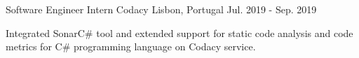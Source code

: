 \begin{cventries}
  \cventry
    {Software Engineer Intern} %
    {Codacy} %
    {Lisbon, Portugal} %
    {Jul. 2019 - Sep. 2019} %
    {
      \begin{cvitems} %
        \item {Integrated SonarC\# tool and extended support for static code analysis and code metrics for C\# programming language on Codacy service.}
      \end{cvitems}
    }

\end{cventries}
